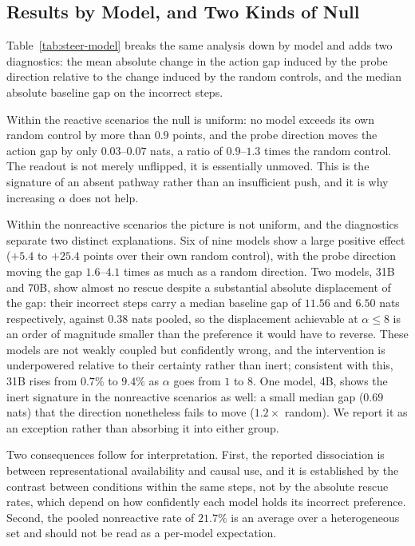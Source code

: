 \subsection{Results by Model, and Two Kinds of Null}

Table~\ref{tab:steer-model} breaks the same analysis down by model and adds
two diagnostics: the mean absolute change in the action gap induced by the
probe direction relative to the change induced by the random controls, and the
median absolute baseline gap on the incorrect steps.

Within the reactive scenarios the null is uniform: no model exceeds its own
random control by more than \(0.9\) points, and the probe direction moves the
action gap by only \(0.03\)--\(0.07\) nats, a ratio of \(0.9\)--\(1.3\) times
the random control. The readout is not merely unflipped, it is essentially
unmoved. This is the signature of an absent pathway rather than an insufficient
push, and it is why increasing \(\alpha\) does not help.

Within the nonreactive scenarios the picture is not uniform, and the diagnostics
separate two distinct explanations. Six of nine models show a large positive
effect (\(+5.4\) to \(+25.4\) points over their own random control), with the
probe direction moving the gap \(1.6\)--\(4.1\) times as much as a random
direction. Two models,  31B and  70B, show
almost no rescue despite a substantial absolute displacement of the gap: their
incorrect steps carry a median baseline gap of \(11.56\) and \(6.50\) nats
respectively, against \(0.38\) nats pooled, so the displacement achievable at
\(\alpha\le8\) is an order of magnitude smaller than the preference it would
have to reverse. These models are not weakly coupled but confidently wrong, and
the intervention is underpowered relative to their certainty rather than inert;
consistent with this,  31B rises from \(0.7\%\) to \(9.4\%\) as
\(\alpha\) goes from \(1\) to \(8\). One model,  4B, shows the
inert signature in the nonreactive scenarios as well: a small median gap
(\(0.69\) nats) that the direction nonetheless fails to move
(\(1.2\times\) random). We report it as an exception rather than absorbing it
into either group.

Two consequences follow for interpretation. First, the reported dissociation is
between representational availability and causal use, and it is established by
the contrast between conditions within the same steps, not by the absolute
rescue rates, which depend on how confidently each model holds its incorrect
preference. Second, the pooled nonreactive rate of \(21.7\%\) is an average over
a heterogeneous set and should not be read as a per-model expectation.


